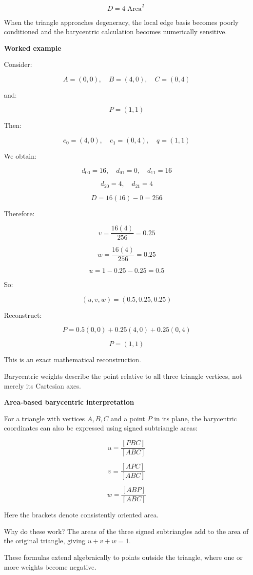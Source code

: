\[
D=4\operatorname{Area}^2
\]

When the triangle approaches degeneracy, the local edge basis becomes poorly conditioned and the barycentric calculation becomes numerically sensitive.

\textbf{Worked example}

Consider:

\[
A=(0,0),\quad B=(4,0),\quad C=(0,4)
\]

and:

\[
P=(1,1)
\]

Then:

\[
e_0=(4,0),\quad e_1=(0,4),\quad q=(1,1)
\]

We obtain:

\[
d_{00}=16,\quad d_{01}=0,\quad d_{11}=16
\]

\[
d_{20}=4,\quad d_{21}=4
\]

\[
D=16(16)-0=256
\]

Therefore:

\[
v=\frac{16(4)}{256}=0.25
\]

\[
w=\frac{16(4)}{256}=0.25
\]

\[
u=1-0.25-0.25=0.5
\]

So:

\[
\boxed{(u,v,w)=(0.5,0.25,0.25)}
\]

Reconstruct:

\[
P=0.5(0,0)+0.25(4,0)+0.25(0,4)
\]

\[
P=(1,1)
\]

This is an exact mathematical reconstruction.

Barycentric weights describe the point relative to all three triangle vertices, not merely its Cartesian axes.

\textbf{Area-based barycentric interpretation}

For a triangle with vertices \(A,B,C\) and a point \(P\) in its plane, the barycentric coordinates can also be expressed using signed subtriangle areas:

\[
u=\frac{[PBC]}{[ABC]}
\]

\[
v=\frac{[APC]}{[ABC]}
\]

\[
w=\frac{[ABP]}{[ABC]}
\]

Here the brackets denote consistently oriented area.

Why do these work? The areas of the three signed subtriangles add to the area of the original triangle, giving \(u+v+w=1\).

These formulas extend algebraically to points outside the triangle, where one or more weights become negative.

